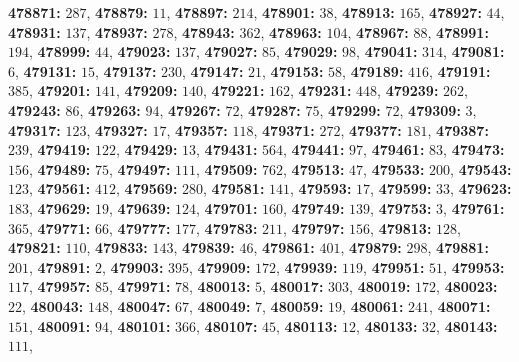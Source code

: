 \textsf{\bfseries 478871:} $287$, \textsf{\bfseries 478879:} $11$, \textsf{\bfseries 478897:} $214$, \textsf{\bfseries 478901:} $38$, \textsf{\bfseries 478913:} $165$, \textsf{\bfseries 478927:} $44$, \textsf{\bfseries 478931:} $137$, \textsf{\bfseries 478937:} $278$, \textsf{\bfseries 478943:} $362$, \textsf{\bfseries 478963:} $104$, \textsf{\bfseries 478967:} $88$, \textsf{\bfseries 478991:} $194$, \textsf{\bfseries 478999:} $44$, \textsf{\bfseries 479023:} $137$, \textsf{\bfseries 479027:} $85$, \textsf{\bfseries 479029:} $98$, \textsf{\bfseries 479041:} $314$, \textsf{\bfseries 479081:} $6$, \textsf{\bfseries 479131:} $15$, \textsf{\bfseries 479137:} $230$, \textsf{\bfseries 479147:} $21$, \textsf{\bfseries 479153:} $58$, \textsf{\bfseries 479189:} $416$, \textsf{\bfseries 479191:} $385$, \textsf{\bfseries 479201:} $141$, \textsf{\bfseries 479209:} $140$, \textsf{\bfseries 479221:} $162$, \textsf{\bfseries 479231:} $448$, \textsf{\bfseries 479239:} $262$, \textsf{\bfseries 479243:} $86$, \textsf{\bfseries 479263:} $94$, \textsf{\bfseries 479267:} $72$, \textsf{\bfseries 479287:} $75$, \textsf{\bfseries 479299:} $72$, \textsf{\bfseries 479309:} $3$, \textsf{\bfseries 479317:} $123$, \textsf{\bfseries 479327:} $17$, \textsf{\bfseries 479357:} $118$, \textsf{\bfseries 479371:} $272$, \textsf{\bfseries 479377:} $181$, \textsf{\bfseries 479387:} $239$, \textsf{\bfseries 479419:} $122$, \textsf{\bfseries 479429:} $13$, \textsf{\bfseries 479431:} $564$, \textsf{\bfseries 479441:} $97$, \textsf{\bfseries 479461:} $83$, \textsf{\bfseries 479473:} $156$, \textsf{\bfseries 479489:} $75$, \textsf{\bfseries 479497:} $111$, \textsf{\bfseries 479509:} $762$, \textsf{\bfseries 479513:} $47$, \textsf{\bfseries 479533:} $200$, \textsf{\bfseries 479543:} $123$, \textsf{\bfseries 479561:} $412$, \textsf{\bfseries 479569:} $280$, \textsf{\bfseries 479581:} $141$, \textsf{\bfseries 479593:} $17$, \textsf{\bfseries 479599:} $33$, \textsf{\bfseries 479623:} $183$, \textsf{\bfseries 479629:} $19$, \textsf{\bfseries 479639:} $124$, \textsf{\bfseries 479701:} $160$, \textsf{\bfseries 479749:} $139$, \textsf{\bfseries 479753:} $3$, \textsf{\bfseries 479761:} $365$, \textsf{\bfseries 479771:} $66$, \textsf{\bfseries 479777:} $177$, \textsf{\bfseries 479783:} $211$, \textsf{\bfseries 479797:} $156$, \textsf{\bfseries 479813:} $128$, \textsf{\bfseries 479821:} $110$, \textsf{\bfseries 479833:} $143$, \textsf{\bfseries 479839:} $46$, \textsf{\bfseries 479861:} $401$, \textsf{\bfseries 479879:} $298$, \textsf{\bfseries 479881:} $201$, \textsf{\bfseries 479891:} $2$, \textsf{\bfseries 479903:} $395$, \textsf{\bfseries 479909:} $172$, \textsf{\bfseries 479939:} $119$, \textsf{\bfseries 479951:} $51$, \textsf{\bfseries 479953:} $117$, \textsf{\bfseries 479957:} $85$, \textsf{\bfseries 479971:} $78$, \textsf{\bfseries 480013:} $5$, \textsf{\bfseries 480017:} $303$, \textsf{\bfseries 480019:} $172$, \textsf{\bfseries 480023:} $22$, \textsf{\bfseries 480043:} $148$, \textsf{\bfseries 480047:} $67$, \textsf{\bfseries 480049:} $7$, \textsf{\bfseries 480059:} $19$, \textsf{\bfseries 480061:} $241$, \textsf{\bfseries 480071:} $151$, \textsf{\bfseries 480091:} $94$, \textsf{\bfseries 480101:} $366$, \textsf{\bfseries 480107:} $45$, \textsf{\bfseries 480113:} $12$, \textsf{\bfseries 480133:} $32$, \textsf{\bfseries 480143:} $111$, 
